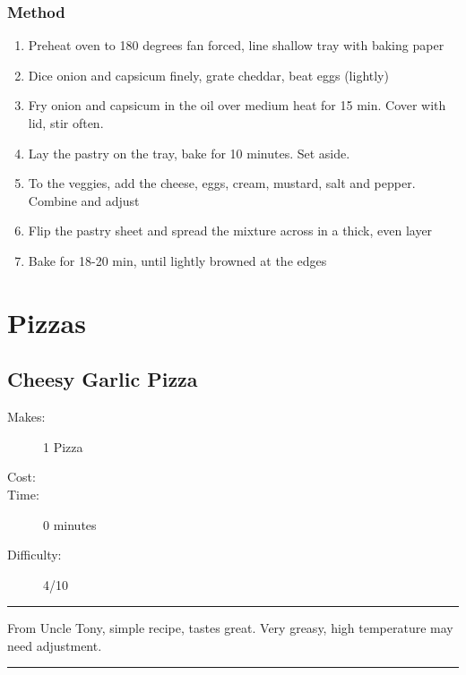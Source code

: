 \documentclass[]{article}
\begin{document}
\subsubsection*{\Large Method}
\begin{enumerate}[font=\huge\color{accent}]
	\item Preheat oven to 180 degrees fan forced, line shallow tray with baking paper
	\item Dice onion and capsicum finely, grate cheddar, beat eggs (lightly)
	\item Fry onion and capsicum in the oil over medium heat for 15 min. Cover with lid, stir often.
	\item Lay the pastry on the tray, bake for 10 minutes. Set aside.
	\item To the veggies, add the cheese, eggs, cream, mustard, salt and pepper. Combine and adjust
	\item Flip the pastry sheet and spread the mixture across in a thick, even layer
	\item Bake for 18-20 min, until lightly browned at the edges
\end{enumerate}
\newpage
{}
\section*{\center\Huge\color{accent}Pizzas}
\label{cat:Pizzas}
\label{rec:Cheesy Garlic Pizza}
\subsection*{\center\huge Cheesy Garlic Pizza}
\begin{description}
\item[Makes:] 1 Pizza
\item[Cost:] \textdollar
\item[Time:] 0 minutes
\item[Difficulty:] 4/10
\end{description}
\vspace{0.2cm}\hrule\vspace{0.5cm}
\begin{adjustwidth}{0.5 cm}{0.5 cm}

From Uncle Tony, simple recipe, tastes great. Very greasy, high temperature may need adjustment. \hfill\color{accent}{\Large\faVimeoSquare\hspace{0.1cm}\faTruck\hspace{0.1cm}\faHeart\hspace{0.1cm}}\color{black}

\end{adjustwidth}
\vspace{0.5cm}\hrule
\end{document}
